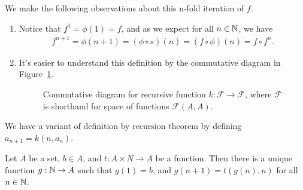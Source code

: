 \documentclass[a4paper,english,12pt]{article}
\begin{document}
\begin{rem} We make the following observations about this n-fold iteration of $f$.
\begin{enumerate}
	\item Notice that $f^1 = \phi(1) = f$, and as we expect for all $n\in \mathbb{N}$, we have
\begin{align*}
f^{n+1} = \phi(n+1) = (\phi \circ s)(n) = (f \circ \phi)(n) = f \circ f^n.
\end{align*}
	\item It's easier to understand this definition by the commutative diagram in Figure~\ref{Figure:DfnRcrsnN-Fold}.
	\begin{figure}[hhhh]%
	\centering
		\scalebox{1.5}{}
	\caption{Commutative diagram for recursive function $k: \mathcal{F} \to \mathcal{F}$, where $\mathcal{F}$ is shorthand for space of functions $\mathcal{F}(A,A)$.}%
	\label{Figure:DfnRcrsnN-Fold}%
	\end{figure}
\end{enumerate}
\end{rem}
We have a variant of definition by recursion theorem by defining $a_{n+1} = k(n, a_n)$.
\begin{thm}\label{Thm:DR-Var1} Let $A$ be a set, $b \in A$, and $t : A \times N \to A$ be a function. Then there is a unique function $g: \mathbb{N} \to A$ such that $g(1) = b$, and $g(n + 1) = t(g(n), n)$ for all $n \in \mathbb{N}$.
\end{thm}
\end{document}
